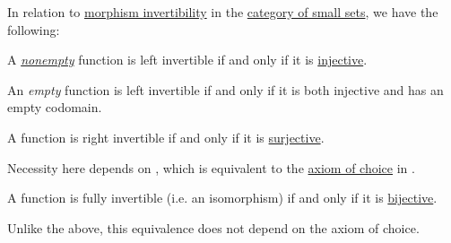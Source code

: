 \begin{proposition}\label{thm:function_invertibility_categorical}
  In relation to \hyperref[def:morphism_invertibility]{morphism invertibility} in the \hyperref[def:category_of_small_sets]{category of small sets}, we have the following:
  \begin{thmenum}
     A \emph{\hyperref[def:set_valued_function/empty]{nonempty}} function is left invertible if and only if it is \hyperref[def:function_invertibility/injective]{injective}.

    An \emph{empty} function is left invertible if and only if it is both injective and has an empty codomain.

     A function is right invertible if and only if it is \hyperref[def:function_invertibility/surjective]{surjective}.

    Necessity here depends on , which is equivalent to the \hyperref[def:zfc/choice]{axiom of choice} in \hyperref[def:zfc]{}.

     A function is fully invertible (i.e. an isomorphism) if and only if it is \hyperref[def:function_invertibility/bijective]{bijective}.

    Unlike the above, this equivalence does not depend on the axiom of choice.
  \end{thmenum}
\end{proposition}
